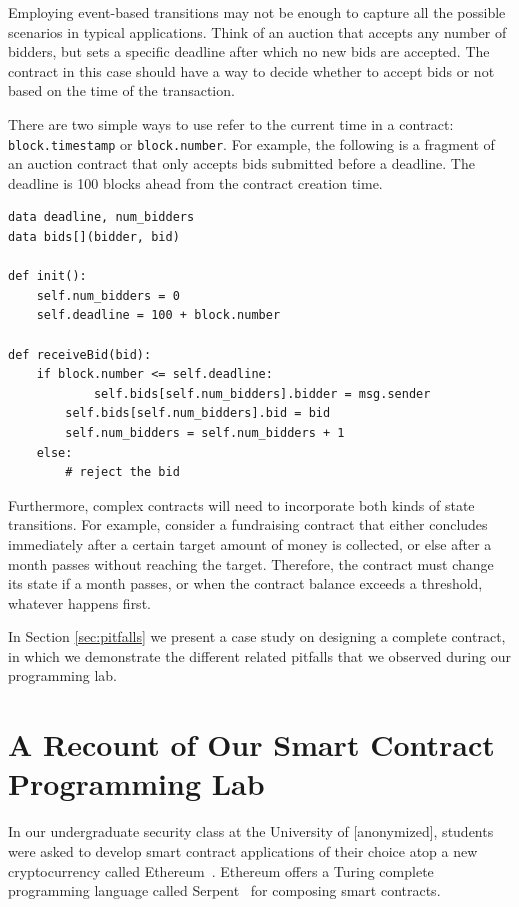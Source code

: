 \documentclass{llncs}
\newcommand{\elaine}[1]{}
\begin{document}
{Employing event-based transitions may not be enough to capture all the possible scenarios in typical applications. Think of an auction that accepts any number of bidders, but sets a specific deadline after which no new bids are accepted. The contract in this case should have a way to decide whether to accept bids or not based on the time of the transaction.

There are two simple ways to use refer to the current time in a contract: \texttt{block.timestamp} or \texttt{block.number}. For example, the following is a fragment of an auction contract that only accepts bids submitted before a deadline. The deadline is 100 blocks ahead from the contract creation time.

\begin{mdframed}
\begin{verbatim}
data deadline, num_bidders
data bids[](bidder, bid)

def init():
	self.num_bidders = 0
	self.deadline = 100 + block.number                

def receiveBid(bid):
	if block.number <= self.deadline:
    		self.bids[self.num_bidders].bidder = msg.sender
		self.bids[self.num_bidders].bid = bid
		self.num_bidders = self.num_bidders + 1
	else:
		# reject the bid
\end{verbatim}
\end{mdframed}                

Furthermore, complex contracts will need to incorporate both kinds of state transitions. For example, consider a fundraising contract that either concludes immediately after a certain target amount of money is collected, or else after a month passes without reaching the target. Therefore, the contract must change its state if a month passes, or when the contract balance exceeds a threshold, whatever happens first.

In Section \ref{sec:pitfalls} we present a case study on designing a complete contract, in which we demonstrate the different related pitfalls that we observed during our programming lab.
}

\section{A Recount of Our Smart Contract Programming Lab}
\label{sec:lab}
In our undergraduate security class at the University of [anonymized], %
students were asked to develop smart contract applications of their choice
atop a new cryptocurrency called Ethereum~\cite{ethereum}. %
Ethereum offers a Turing complete programming language
called Serpent~\cite{serpent} for composing smart contracts. 
\end{document}
